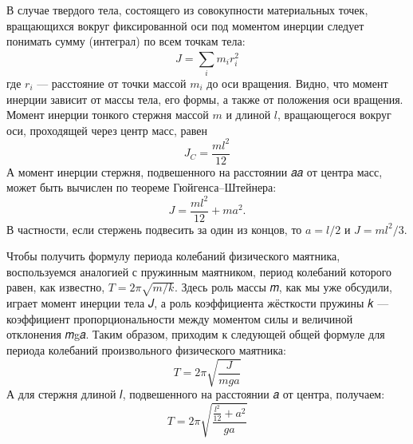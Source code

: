 \documentclass[12pt, a4paper]{article}
\begin{document}
        В случае твердого тела, состоящего из совокупности материальных точек, вращающихся вокруг
        фиксированной оси под моментом инерции следует понимать сумму (интеграл) по всем точкам тела:
        \begin{displaymath}
            J = \sum_{i}^{} m_ir_i^2  
        \end{displaymath}
        где $r_i$ --- расстояние от точки массой $m_i$ до оси вращения. Видно, что момент инерции зависит от массы тела, его формы, а также от положения оси
        вращения. Момент инерции тонкого стержня массой $𝑚$ и длиной $𝑙$, вращающегося вокруг оси,
        проходящей через центр масс, равен
        \begin{displaymath}
            J_C = \frac{ml^2}{12}
        \end{displaymath}
        А момент инерции стержня, подвешенного на расстоянии 𝑎𝑎 от центра масс,
        может быть вычислен по теореме Гюйгенса–Штейнера:
        \begin{equation}
            J = \frac{ml^2}{12} + ma^2.
        \end{equation}
        В частности, если стержень подвесить за один из концов, то $a = l/2$ и $J = ml^2/3$.

        Чтобы получить формулу периода колебаний физического маятника,
        воспользуемся аналогией с пружинным маятником, период колебаний которого равен, как известно, $𝑇 = 2\pi\sqrt{𝑚/𝑘}$. Здесь роль массы 𝑚, как мы уже
        обсудили, играет момент инерции тела 𝐽, а роль коэффициента жёсткости
        пружины 𝑘 — коэффициент пропорциональности между моментом силы и
        величиной отклонения 𝑚g𝑎. Таким образом, приходим к следующей общей формуле для периода колебаний произвольного физического маятника:
        \begin{equation}
            T = 2\pi\sqrt{\frac{J}{mga}}
        \end{equation}
        А для стержня длиной 𝑙, подвешенного на расстоянии 𝑎 от центра, получаем:
        \begin{equation}
            T = 2\pi\sqrt{
                \frac{
                    \frac{l^2}{12} + a^2}
                    {ga}
            }
        \end{equation}
\end{document}

